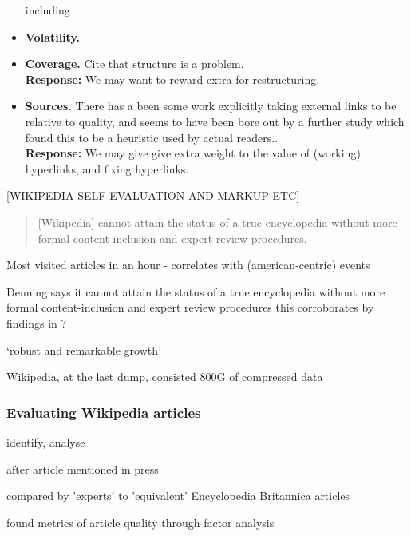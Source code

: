 \documentclass[a4paper,11pt,twoside,notitlepage]{article}
\begin{document}
\begin{itemize}
            including 
          \item \textbf{Volatility.} 
          \item \textbf{Coverage.} Cite that structure is a
            problem.\\
            \textbf{Response:} We may want to reward extra for restructuring.
          \item \textbf{Sources.} There has a been some work
            explicitly taking external links to be relative to
            quality,\cite{CITEHYPERLINKS} and seems to have been bore
            out by a further study which found this to be a heuristic
            used by actual readers.\cite{THISHEURISTICIGUESS}.\\
            \textbf{Response:} We may give give extra weight to the value
            of (working) hyperlinks, and fixing hyperlinks.
        \end{itemize}
            
        [WIKIPEDIA SELF EVALUATION AND MARKUP ETC]
        \begin{quote}
          [Wikipedia] cannot attain the status of a true encyclopedia
          without more formal content-inclusion and expert review
          procedures.\cite{Denning2005}
        \end{quote}

        Most visited articles in an hour - correlates with
        (american-centric) events \cite{wiki-visits}

        Denning says it cannot attain the status of a true
        encyclopedia without more formal content-inclusion and expert
        review procedures\cite{Denning2005} this corroborates by
        findings in \cite{Giles2005}?

        `robust and remarkable growth'
        \cite{Kittur2007}\cite{Voss2005} 
        
        Wikipedia, at the last dump, consisted 800G of compressed data
        \cite{wiki-dump}

        \subsubsection{Evaluating Wikipedia articles}
        identify, analyse

        after article mentioned in press \cite{Lih2004}

        compared by 'experts' to 'equivalent' Encyclopedia Britannica articles \cite{Giles2005}

        found metrics of article quality through factor analysis
        \cite{Stvilia2005}
\end{document}
